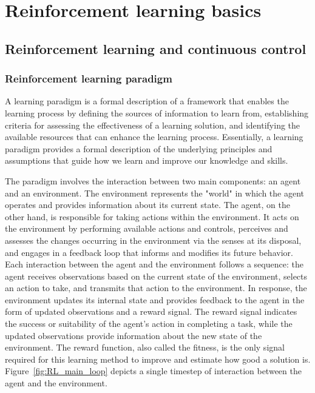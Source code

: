 
\chapter{Reinforcement learning basics}
\label{ch:reinforcement_learning}

\section{Reinforcement learning and continuous control}

\subsection{Reinforcement learning paradigm}
A learning paradigm is a formal description of a framework that enables the learning process by defining the sources of information to learn from, establishing criteria for assessing the effectiveness of a learning solution, and identifying the available resources that can enhance the learning process. Essentially, a learning paradigm provides a formal description of the underlying principles and assumptions that guide how we learn and improve our knowledge and skills.

The paradigm involves the interaction between two main components: an agent and an environment. The environment represents the "world" in which the agent operates and provides information about its current state. The agent, on the other hand, is responsible for taking actions within the environment. It acts on the environment by performing available actions and controls, perceives and assesses the changes occurring in the environment via the senses at its disposal, and engages in a feedback loop that informs and modifies its future behavior. Each interaction between the agent and the environment follows a sequence: the agent receives observations based on the current state of the environment, selects an action to take, and transmits that action to the environment. In response, the environment updates its internal state and provides feedback to the agent in the form of updated observations and a reward signal. The reward signal indicates the success or suitability of the agent's action in completing a task, while the updated observations provide information about the new state of the environment. The reward function, also called the fitness, is the only signal required for this learning method to improve and estimate how good a solution is. Figure~\ref{fig:RL_main_loop} depicts a single timestep of interaction between the agent and the environment.

